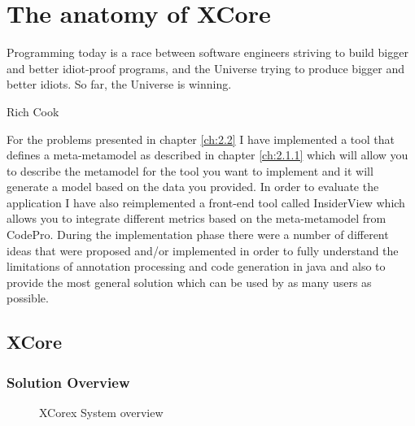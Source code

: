 \chapter{The anatomy of XCore }\label{ch:3}

\epigraph{Programming today is a race between software engineers striving to
build bigger and better idiot-proof programs, and the Universe trying to produce
bigger and better idiots. So far, the Universe is winning.}{Rich Cook}

	For the problems presented in chapter \ref{ch:2.2} I have implemented a tool
that defines a meta-metamodel as described in chapter \ref{ch:2.1.1} which will
allow you to describe the metamodel for the tool you want to implement and it will generate 
a model based on the data you provided. In order to evaluate the application I
have also reimplemented a front-end tool called InsiderView \cite{tools:iPlasma}
which allows you to integrate different metrics based on the meta-metamodel from 
CodePro.
	During the implementation phase there were a number of different ideas
that were proposed and/or implemented in order to fully understand the
limitations of annotation processing and code generation in java and also to
provide the most general solution which can be used by as many users as
possible.

\section{XCore}

\subsection{Solution Overview}
	 
\begin{figure}
\centering
{}
\caption{XCorex System overview}
\label{fig:XCoreSystem}
\end{figure}

